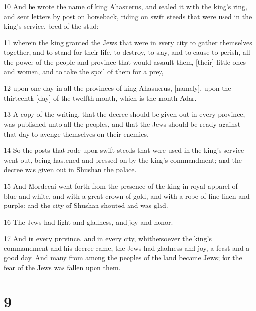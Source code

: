 \par 10 And he wrote the name of king Ahasuerus, and sealed it with the king's ring, and sent letters by post on horseback, riding on swift steeds that were used in the king's service, bred of the stud:
\par 11 wherein the king granted the Jews that were in every city to gather themselves together, and to stand for their life, to destroy, to slay, and to cause to perish, all the power of the people and province that would assault them, [their] little ones and women, and to take the spoil of them for a prey,
\par 12 upon one day in all the provinces of king Ahasuerus, [namely], upon the thirteenth [day] of the twelfth month, which is the month Adar.
\par 13 A copy of the writing, that the decree should be given out in every province, was published unto all the peoples, and that the Jews should be ready against that day to avenge themselves on their enemies.
\par 14 So the posts that rode upon swift steeds that were used in the king's service went out, being hastened and pressed on by the king's commandment; and the decree was given out in Shushan the palace.
\par 15 And Mordecai went forth from the presence of the king in royal apparel of blue and white, and with a great crown of gold, and with a robe of fine linen and purple: and the city of Shushan shouted and was glad.
\par 16 The Jews had light and gladness, and joy and honor.
\par 17 And in every province, and in every city, whithersoever the king's commandment and his decree came, the Jews had gladness and joy, a feast and a good day. And many from among the peoples of the land became Jews; for the fear of the Jews was fallen upon them.

\chapter{9}

